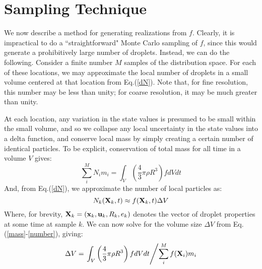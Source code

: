 \documentclass{article}
\begin{document}
\section{Sampling Technique}
We now describe a method for generating realizations from $f$. Clearly, it is impractical to do a ``straightforward"
Monte Carlo sampling of $f$, since this would generate a prohibitively large number of droplets. Instead, we can do 
the following. Consider a finite number $M$ samples of the distribution space. For each of these locations, we may 
approximate the local number of droplets in a small volume centered at that location from Eq.(\ref{dN}). Note that, 
for fine resolution, this number may be less than unity; for coarse resolution, it may be much greater than unity. 

At each location, any variation in the state values is presumed to be small within the small volume, and so we collapse 
any local uncertainty in the state values into a delta function, and conserve local mass by 
simply creating a certain number of identical particles. To be explicit, conservation of total mass for all time in a volume 
$V$ gives:
\begin{equation}
\label{mass}
\sum_i^M N_i m_i = \int_V \left(\frac{4}{3} \pi \rho R^3\right) f dV dt
\end{equation}
And, from Eq.(\ref{dN}), we approximate the number of local particles as:
\begin{equation}
\label{number}
N_k({\bf X}_k,t) \approx f({\bf X}_k,t) \Delta V
\end{equation}
Where, for brevity, ${\bf X}_k = ({\bf x}_k, {\bf u}_k, R_k, e_k)$ denotes the vector of droplet properties at some time at sample $k$.
We can now solve for the volume size $\Delta V$ from Eq.(\ref{mass}-\ref{number}), giving:
\begin{equation}
\Delta V = \left. \int_V \left(\frac{4}{3} \pi \rho R^3\right) f dV dt \middle/ \sum_i^M f({\bf X}_i) m_i \right.
\end{equation}
\end{document}
